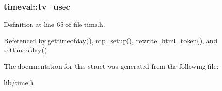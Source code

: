 \hypertarget{structtimeval_a8fd7abf5420981b3ff58bb23df458587}{
\subsubsection[{tv\-\_\-usec}]{ timeval\-::tv\-\_\-usec}}\label{structtimeval_a8fd7abf5420981b3ff58bb23df458587}


Definition at line 65 of file time.\-h.



Referenced by gettimeofday(), ntp\-\_\-setup(), rewrite\-\_\-html\-\_\-token(), and settimeofday().



The documentation for this struct was generated from the following file\-:\begin{DoxyCompactItemize}
\item 
lib/\hyperlink{time_8h}{time.\-h}\end{DoxyCompactItemize}
